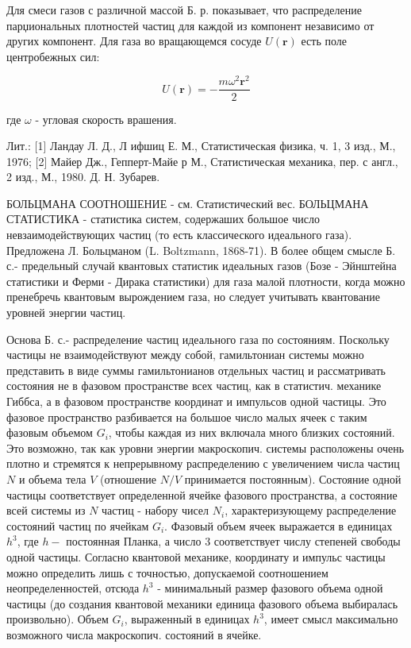 \documentclass[10pt]{article}
\begin{document}
Для смеси газов с различной массой Б. р. показывает, что распределение парџиональных плотностей частиц для каждой из компонент независимо от других компонент. Для газа во вращающемся сосуде $U(\boldsymbol{r})$ есть поле центробежных сил:



\[

U(\boldsymbol{r})=-\frac{m \omega^{2} \boldsymbol{r}^{2}}{2}

\]



где $\omega$ - угловая скорость врашения.



Лит.: [1] Ландау Л. Д., Л ифшиц Е. М., Статистическая физика, ч. 1, 3 изд., М., 1976; [2] Майер Дж., Гепперт-Майе р М., Статистическая механика, пер. с англ., 2 изд., М., 1980. Д. Н. Зубарев.



БОЛЬЦМАНА СООТНОШЕНИЕ - см. Статистический вес. БОЛЬЦМАНА СТАТИСТИКА - статистика систем, содержаших большое число невзаимодействующих частиц (то есть классического идеального газа). Предложена Л. Больцманом (L. Boltzmann, 1868-71). В более общем смысле Б. с.- предельный случай квантовых статистик идеальных газов (Бозе - Эйнштейна статистики и Ферми - Дирака статистики) для газа малой плотности, когда можно пренебречь квантовым вырождением газа, но следует учитывать квантование уровней энергии частиц.



Основа Б. с.- распределение частиц идеального газа по состояниям. Поскольку частицы не взаимодействуют между собой, гамильтониан системы можно представить в виде суммы гамильтонианов отдельных частиц и рассматривать состояния не в фазовом пространстве всех частиц, как в статистич. механике Гиббса, а в фазовом пространстве координат и импульсов одной частицы. Это фазовое пространство разбивается на большое число малых ячеек с таким фазовым объемом $G_{i}$, чтобы каждая из них включала много близких состояний. Это возможно, так как уровни энергии макроскопич. системы расположены очень плотно и стремятся к непрерывному распределению с увеличением числа частиц $N$ и объема тела $V$ (отношение $N / V$ принимается постоянным). Состояние одной частицы соответствует определенной ячейке фазового пространства, а состояние всей системы из $N$ частиц - набору чисел $N_{i}$, характеризующему распределение состояний частиц по ячейкам $G_{i}$. Фазовый объем ячеек выражается в единицах $h^{3}$, где $h-$ постоянная Планка, а число 3 соответствует числу степеней свободы одной частицы. Согласно квантовой механике, координату и импульс частицы можно определить лишь с точностью, допускаемой соотношением неопределенностей, отсюда $h^{3}$ - минимальный размер фазового объема одной частицы (до создания квантовой механики единица фазового объема выбиралась произвольно). Объем $G_{i}$, выраженный в единицах $h^{3}$, имеет смысл максимально возможного числа макроскопич. состояний в ячейке.
\end{document}

